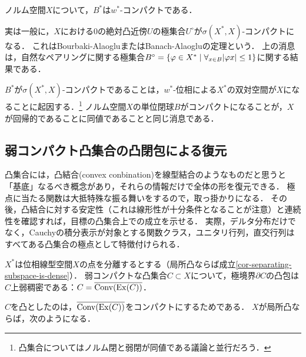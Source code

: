 \documentclass[uplatex,dvipdfmx]{jsreport}
\begin{document}
\begin{theorem}\label{thm-Alaoglu}
    ノルム空間$X$について，$B^*$は$w^*$-コンパクトである．
\end{theorem}
\begin{remarks}
    実は一般に，$X$における$0$の絶対凸近傍$U$の極集合$U^\circ$が$\sigma(X^*,X)$-コンパクトになる．
    これはBourbaki-AlaogluまたはBanach-Alaogluの定理という．
    上の消息は，自然なペアリングに関する極集合$B^\circ=\left\{\varphi\in X^*\mid\forall_{x\in B}\lvert\varphi x\rvert\le1\right\}$に関する結果である．
\end{remarks}
\begin{remarks}
    $B^*$が$\sigma(X^*,X)$-コンパクトであることは，$w^*$-位相による$X^*$の双対空間が$X$になることに起因する．\footnote{凸集合についてはノルム閉と弱閉が同値である議論と並行だろう．}
    ノルム空間$X$の単位閉球$B$がコンパクトになることが，$X$が回帰的であることに同値であることと同じ消息である．
\end{remarks}

\subsection{弱コンパクト凸集合の凸閉包による復元}

\begin{tcolorbox}[colframe=ForestGreen, colback=ForestGreen!10!white,breakable,colbacktitle=ForestGreen!40!white,coltitle=black,fonttitle=\bfseries\sffamily,
title=コンパクト凸集合の代数的特徴付けを与える]
    凸集合には，凸結合(convex conbination)を線型結合のようなものだと思うと「基底」なるべき概念があり，それらの情報だけで全体の形を復元できる．
    極点に当たる関数は大抵特殊な振る舞いをするので，取っ掛かりになる．
    その後，凸結合に対する安定性（これは線形性が十分条件となることが注意）と連続性を確認すれば，目標の凸集合上での成立を示せる．
    実際，デルタ分布だけでなく，Cauchyの積分表示が対象とする関数クラス，ユニタリ行列，直交行列はすべてある凸集合の極点として特徴付けられる．
\end{tcolorbox}

\begin{theorem}
    $X^*$は位相線型空間$X$の点を分離するとする（局所凸ならば成立\ref{cor-separating-subspace-is-dense}）．
    弱コンパクトな凸集合$C\subset X$について，極境界$\partial C$の凸包は$C$上弱稠密である：$C=\overline{\mathrm{Conv}(\mathrm{Ex}(C))}$．
\end{theorem}
\begin{remarks}
    $C$を凸としたのは，$\overline{\mathrm{Conv}(\mathrm{Ex}(C))}$をコンパクトにするためである．
    $X$が局所凸ならば，次のようになる．
\end{remarks}
\end{document}
